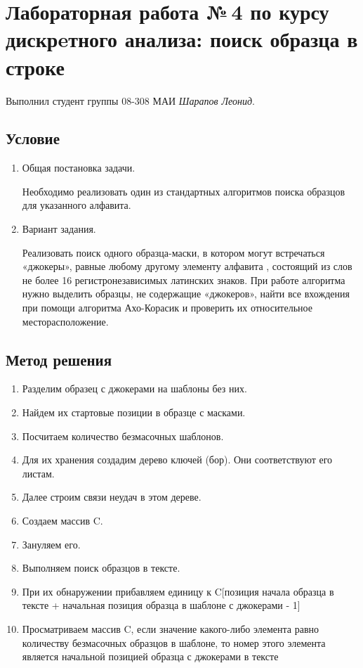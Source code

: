 \documentclass[12pt]{article}
\begin{document}
\section*{Лабораторная работа №\,4 по курсу дискрeтного анализа: поиск образца в строке}

Выполнил студент группы 08-308 МАИ \textit{Шарапов Леонид}.

\subsection*{Условие}

\begin{enumerate}
\item Общая постановка задачи.

Необходимо реализовать один из стандартных алгоритмов поиска образцов для указанного алфавита.

\item Вариант задания. 

Реализовать поиск одного образца-маски, в котором могут встречаться «джокеры», равные любому другому элементу алфавита
, состоящий из слов не более 16 регистронезависимых латинских знаков. При работе алгоритма нужно выделить образцы, не содержащие «джокеров», найти все вхождения при помощи алгоритма Ахо-Корасик и проверить их относительное месторасположение. 

\end{enumerate}

\subsection*{Метод решения}

\begin{enumerate}
\item Разделим образец с джокерами на шаблоны без них. 
\item Найдем их стартовые позиции в образце с масками. 
\item Посчитаем количество безмасочных шаблонов. 
\item Для их хранения создадим дерево ключей (бор). Они соответствуют его листам. 
\item Далее строим связи неудач в этом дереве. 
\item Создаем массив C. 
\item Зануляем его. 
\item Выполняем поиск образцов в тексте. 
\item При их обнаружении прибавляем единицу к C[позиция начала образца в тексте + начальная позиция образца в шаблоне с джокерами - 1]
\item Просматриваем массив C, если значение какого-либо элемента равно количеству безмасочных образцов в шаблоне, то номер этого элемента является начальной позицией образца с джокерами в тексте
\end{enumerate}
\end{document}
